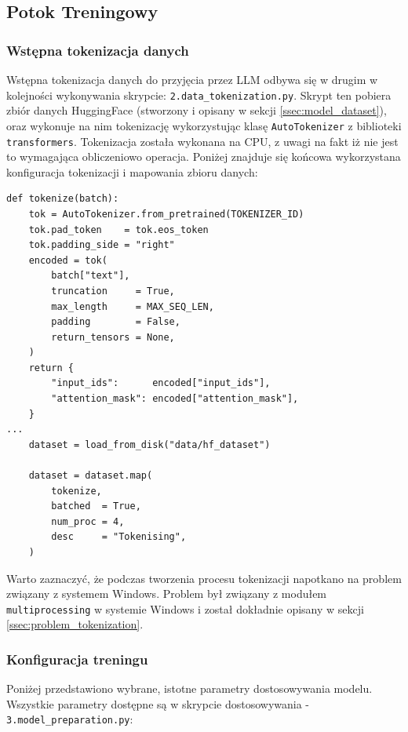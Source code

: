 \documentclass[12pt,a4paper]{article}
\begin{document}
\subsection{Potok Treningowy}

\subsubsection{Wstępna tokenizacja danych}

Wstępna tokenizacja danych do przyjęcia przez LLM odbywa się w drugim w kolejności wykonywania skrypcie: \texttt{2.data\_tokenization.py}. 
Skrypt ten pobiera zbiór danych HuggingFace (stworzony i opisany w sekcji \ref{ssec:model_dataset}), oraz wykonuje na nim tokenizację wykorzystując 
klasę \verb|AutoTokenizer| z biblioteki \texttt{transformers}. Tokenizacja została wykonana na CPU, z uwagi na fakt iż nie jest to wymagająca obliczeniowo operacja.
Poniżej znajduje się końcowa wykorzystana konfiguracja tokenizacji i mapowania zbioru danych:

\begin{tcolorbox}
\begin{verbatim}
def tokenize(batch):
    tok = AutoTokenizer.from_pretrained(TOKENIZER_ID)
    tok.pad_token    = tok.eos_token
    tok.padding_side = "right"
    encoded = tok(
        batch["text"],
        truncation     = True,
        max_length     = MAX_SEQ_LEN,
        padding        = False,
        return_tensors = None,
    )
    return {
        "input_ids":      encoded["input_ids"],
        "attention_mask": encoded["attention_mask"],
    }
... 
    dataset = load_from_disk("data/hf_dataset")

    dataset = dataset.map(
        tokenize,
        batched  = True,
        num_proc = 4,
        desc     = "Tokenising",
    )
\end{verbatim}
\end{tcolorbox}

Warto zaznaczyć, że podczas tworzenia procesu tokenizacji napotkano na problem związany z systemem Windows. Problem był związany z modułem \texttt{multiprocessing} 
w systemie Windows i został dokładnie opisany w sekcji \ref{ssec:problem_tokenization}.


\subsubsection{Konfiguracja treningu}
\label{sssec:model_configuration}

Poniżej przedstawiono wybrane, istotne parametry dostosowywania modelu. Wszystkie parametry dostępne są w skrypcie dostosowywania - \texttt{3.model\_preparation.py}:
\end{document}
